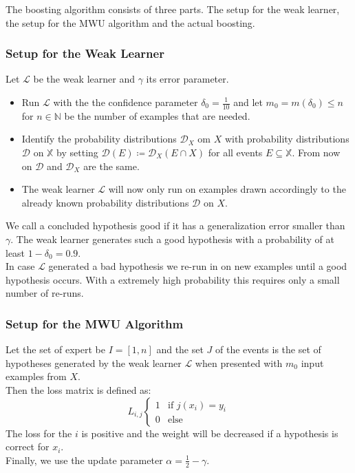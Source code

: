 \documentclass{panikzettel}
\begin{document}
The boosting algorithm consists of three parts. The setup for the weak learner, the setup for the MWU algorithm and the actual boosting.

\subsubsection{Setup for the Weak Learner}
Let $\mathcal{L}$ be the weak learner and $\gamma$ its error parameter.
\begin{itemize}
\item Run $\mathcal{L}$ with the the confidence parameter $\delta_0=\frac{1}{10}$ and let $m_0=m(\delta_0)\leq n$ for $n\in\mathbb{N}$ be the number of examples that are needed.
\item Identify the probability distributions $\mathcal{D}_X$ om $X$ with probability distributions $\mathcal{D}$ on $\mathbb{X}$ by setting $\mathcal{D}(E)\coloneqq \mathcal{D}_X(E\cap X)$ for all events $E\subseteq \mathbb{X}$. From now on $\mathcal{D}$ and $\mathcal{D}_X$ are the same.
\item The weak learner $\mathcal{L}$ will now only run on examples drawn accordingly to the already known probability distributions $\mathcal{D}$ on $X$.
\end{itemize}

We call a concluded hypothesis good if it has a generalization error smaller than $\gamma$. The weak learner generates such a good hypothesis with a probability of at least $1-\delta_0=0.9$.\\
In case $\mathcal{L}$ generated a bad hypothesis we re-run in on new examples until a good hypothesis occurs. With a extremely high probability this requires only a small number of re-runs. %


\subsubsection{Setup for the MWU Algorithm}
Let the set of expert be $I=[1,n]$ and the set $J$ of the events is the set of hypotheses generated by the weak learner $\mathcal{L}$ when presented with $m_0$ input examples from $X$.\\
Then the loss matrix is defined as:
\[
L_{i,j}
\begin{cases}
1 & \text{if } j(x_i)=y_i\\
0 & \text{else}
\end{cases}
\]
The loss for the $i$ is positive and the weight will be decreased if a hypothesis is correct for $x_i$.\\
Finally, we use the update parameter $\alpha=\frac{1}{2}-\gamma$.
\end{document}
